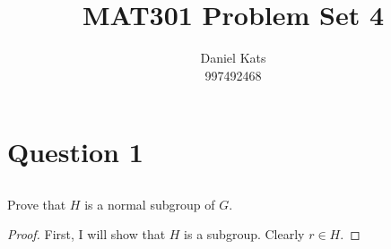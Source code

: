 \documentclass[a4paper,12pt]{article}
\numberwithin{equation}{section}
\begin{document}
\begin{titlepage}
\title{MAT301 Problem Set 4}
\author{Daniel Kats \\ 997492468}
\clearpage
\maketitle
\thispagestyle{empty}
\end{titlepage}

\section{Question 1}

\subsection{ }

Prove that $H$ is a normal subgroup of $G$.

\begin{proof}
First, I will show that $H$ is a subgroup. Clearly $r \in H$.
\end{proof}
\end{document}
